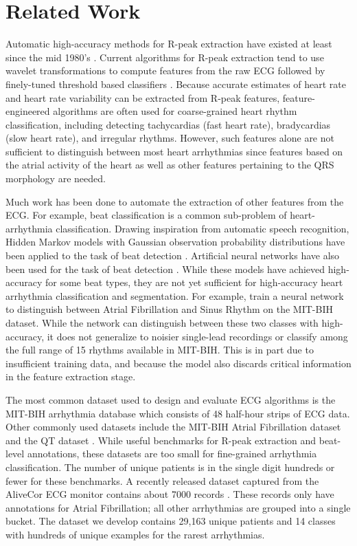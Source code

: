 \section{Related Work}
\label{sec:arrhythmias:related}

Automatic high-accuracy methods for R-peak extraction have existed at least
since the mid 1980's \cite{pan1985real}. Current algorithms for R-peak
extraction tend to use wavelet transformations to compute features from the raw
ECG followed by finely-tuned threshold based classifiers \cite{li1995detection,
martinez2004wavelet}. Because accurate estimates of heart rate and heart rate
variability can be extracted from R-peak features, feature-engineered
algorithms are often used for coarse-grained heart rhythm classification,
including detecting tachycardias (fast heart rate), bradycardias (slow heart
rate), and irregular rhythms. However, such features alone are not sufficient
to distinguish between most heart arrhythmias since features based on the
atrial activity of the heart as well as other features pertaining to the QRS
morphology are needed.

Much work has been done to automate the extraction of other features from the
ECG. For example, beat classification is a common sub-problem of
heart-arrhythmia classification. Drawing inspiration from automatic speech
recognition, Hidden Markov models with Gaussian observation probability
distributions have been applied to the task of beat detection
\cite{coast1990approach}. Artificial neural networks have also been used for
the task of beat detection \cite{melo2000arrhythmia}. While these models have
achieved high-accuracy for some beat types, they are not yet sufficient for
high-accuracy heart arrhythmia classification and segmentation. For example,
\cite{artis1991detection} train a neural network to distinguish between Atrial
Fibrillation and Sinus Rhythm on the MIT-BIH dataset. While the network can
distinguish between these two classes with high-accuracy, it does not
generalize to noisier single-lead recordings or classify among the full range
of 15 rhythms available in MIT-BIH. This is in part due to insufficient
training data, and because the model also discards critical information in the
feature extraction stage.

The most common dataset used to design and evaluate ECG algorithms is the
MIT-BIH arrhythmia database \cite{moody2001impact} which consists of 48
half-hour strips of ECG data. Other commonly used datasets include the MIT-BIH
Atrial Fibrillation dataset \cite{moody1983new} and the QT dataset
\cite{laguna1997database}. While useful benchmarks for R-peak extraction and
beat-level annotations, these datasets are too small for fine-grained
arrhythmia classification. The number of unique patients is in the single digit
hundreds or fewer for these benchmarks. A recently released dataset captured
from the AliveCor ECG monitor contains about 7000 records \cite{clifford2017}.
These records only have annotations for Atrial Fibrillation; all other
arrhythmias are grouped into a single bucket. The dataset we develop contains
29,163 unique patients and 14 classes with hundreds of unique examples for
the rarest arrhythmias.


